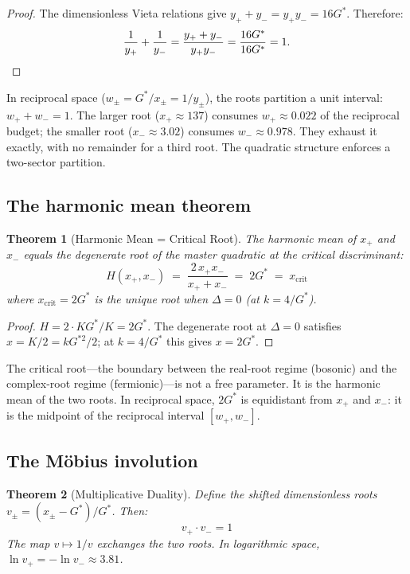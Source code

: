 \documentclass[12pt]{article}
\newtheorem{theorem}{Theorem}[section]
\theoremstyle{definition}
\theoremstyle{remark}
\begin{document}
\begin{proof}
The dimensionless Vieta relations give $y_+ + y_- = y_+ y_- = 16G^*$. Therefore:
\[
    \frac{1}{y_+} + \frac{1}{y_-} = \frac{y_+ + y_-}{y_+ y_-} = \frac{16G^*}{16G^*} = 1. \qedhere
\]
\end{proof}

In reciprocal space ($w_\pm = G^*/x_\pm = 1/y_\pm$), the roots partition a unit interval: $w_+ + w_- = 1$. The larger root ($x_+ \approx 137$) consumes $w_+ \approx 0.022$ of the reciprocal budget; the smaller root ($x_- \approx 3.02$) consumes $w_- \approx 0.978$. They exhaust it exactly, with no remainder for a third root. The quadratic structure enforces a two-sector partition.

\subsection{The harmonic mean theorem}

\begin{theorem}[Harmonic Mean = Critical Root]
\label{thm:harmonic}
The harmonic mean of $x_+$ and $x_-$ equals the degenerate root of the master quadratic at the critical discriminant:
\begin{equation}
    \boxed{\;H(x_+, x_-) \;=\; \frac{2\,x_+ x_-}{x_+ + x_-} \;=\; 2G^* \;=\; x_{\mathrm{crit}}\;}
    \label{eq:harmonic}
\end{equation}
where $x_{\mathrm{crit}} = 2G^*$ is the unique root when $\Delta = 0$ (at $k = 4/G^*$).
\end{theorem}

\begin{proof}
$H = 2 \cdot KG^*/K = 2G^*$. The degenerate root at $\Delta = 0$ satisfies $x = K/2 = kG^{*2}/2$; at $k = 4/G^*$ this gives $x = 2G^*$. \qedhere
\end{proof}

The critical root---the boundary between the real-root regime (bosonic) and the complex-root regime (fermionic)---is not a free parameter. It is the harmonic mean of the two roots. In reciprocal space, $2G^*$ is equidistant from $x_+$ and $x_-$: it is the midpoint of the reciprocal interval $[w_+, w_-]$.

\subsection{The M\"obius involution}

\begin{theorem}[Multiplicative Duality]
\label{thm:mobius}
Define the shifted dimensionless roots $v_\pm = (x_\pm - G^*)/G^*$. Then:
\begin{equation}
    \boxed{\;v_+ \cdot v_- = 1\;}
    \label{eq:mobius}
\end{equation}
The map $v \mapsto 1/v$ exchanges the two roots. In logarithmic space, $\ln v_+ = -\ln v_- \approx 3.81$.
\end{theorem}
\end{document}
